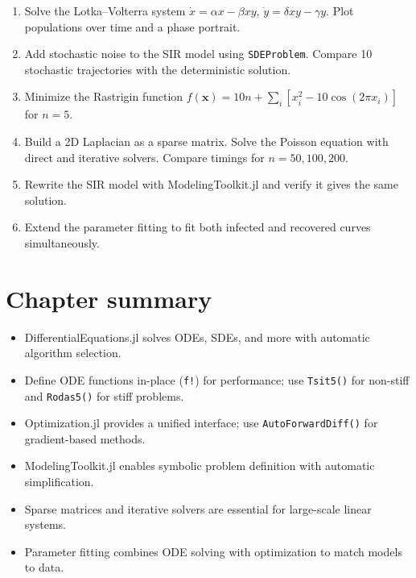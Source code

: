 \begin{exercise}
\begin{enumerate}
  \item Solve the Lotka--Volterra system $\dot{x}=\alpha x - \beta xy$, $\dot{y}=\delta xy - \gamma y$. Plot populations over time and a phase portrait.
  \item Add stochastic noise to the SIR model using \texttt{SDEProblem}. Compare 10 stochastic trajectories with the deterministic solution.
  \item Minimize the Rastrigin function $f(\mathbf{x}) = 10n + \sum_i [x_i^2 - 10\cos(2\pi x_i)]$ for $n=5$.
  \item Build a 2D Laplacian as a sparse matrix. Solve the Poisson equation with direct and iterative solvers. Compare timings for $n=50,100,200$.
  \item Rewrite the SIR model with ModelingToolkit.jl and verify it gives the same solution.
  \item Extend the parameter fitting to fit both infected and recovered curves simultaneously.
\end{enumerate}
\end{exercise}

\section{Chapter summary}

\begin{itemize}
  \item DifferentialEquations.jl solves ODEs, SDEs, and more with automatic algorithm selection.
  \item Define ODE functions in-place (\texttt{f!}) for performance; use \texttt{Tsit5()} for non-stiff and \texttt{Rodas5()} for stiff problems.
  \item Optimization.jl provides a unified interface; use \texttt{AutoForwardDiff()} for gradient-based methods.
  \item ModelingToolkit.jl enables symbolic problem definition with automatic simplification.
  \item Sparse matrices and iterative solvers are essential for large-scale linear systems.
  \item Parameter fitting combines ODE solving with optimization to match models to data.
\end{itemize}
